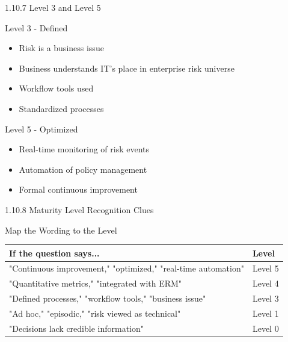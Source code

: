 \documentclass{beamer}
\begin{document}
	\begin{frame}{1.10.7 Level 3 and Level 5}
		\begin{block}{Level 3 - Defined}
			\begin{itemize}
				\item Risk is a business issue
				\item Business understands IT's place in enterprise risk universe
				\item Workflow tools used
				\item Standardized processes
			\end{itemize}
		\end{block}
		\begin{block}{Level 5 - Optimized}
			\begin{itemize}
				\item Real-time monitoring of risk events
				\item Automation of policy management
				\item Formal continuous improvement
			\end{itemize}
		\end{block}
	\end{frame}
	
	\begin{frame}{1.10.8 Maturity Level Recognition Clues}
		\begin{block}{Map the Wording to the Level}
			\begin{tabular}{|p{7cm}|p{2.5cm}|}
				\hline
				\textbf{If the question says...} & \textbf{Level} \\
				\hline
				"Continuous improvement," "optimized," "real-time automation" & Level 5 \\
				\hline
				"Quantitative metrics," "integrated with ERM" & Level 4 \\
				\hline
				"Defined processes," "workflow tools," "business issue" & Level 3 \\
				\hline
				"Ad hoc," "episodic," "risk viewed as technical" & Level 1 \\
				\hline
				"Decisions lack credible information" & Level 0 \\
				\hline
			\end{tabular}
		\end{block}
	\end{frame}
	
\end{document}
